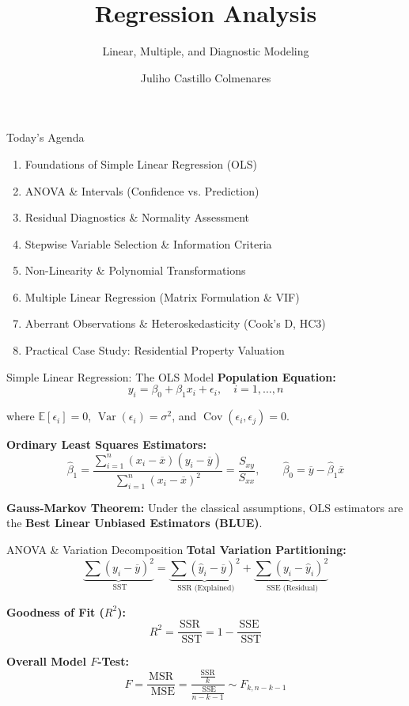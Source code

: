 \documentclass[aspectratio=169,ignorenonframetext]{beamer}
\title{\texorpdfstring{Regression Analysis}{Regression Analysis}}
\author{\texorpdfstring{Juliho Castillo
Colmenares}{Juliho Castillo Colmenares}}
\subtitle{Linear, Multiple, and Diagnostic Modeling}
\institute{Tec de Monterrey}
\date{}
\begin{document}
\frame{\titlepage}

\begin{frame}{Today's Agenda}
\begin{enumerate}
\item
  Foundations of Simple Linear Regression (OLS)
\item
  ANOVA \& Intervals (Confidence vs. Prediction)
\item
  Residual Diagnostics \& Normality Assessment
\item
  Stepwise Variable Selection \& Information Criteria
\item
  Non-Linearity \& Polynomial Transformations
\item
  Multiple Linear Regression (Matrix Formulation \& VIF)
\item
  Aberrant Observations \& Heteroskedasticity (Cook's D, HC3)
\item
  Practical Case Study: Residential Property Valuation
\end{enumerate}
\end{frame}

\begin{frame}{Simple Linear Regression: The OLS Model}
\textbf{Population Equation:}
\[y_{i} = \beta_{0} + \beta_{1}x_{i} + \epsilon_{i},\quad i = 1,\ldots,n\]

where \(\mathbb{E}\left\lbrack \epsilon_{i} \right\rbrack = 0\),
\(\operatorname{Var}(\epsilon_{i}) = \sigma^{2}\), and
\(\operatorname{Cov}(\epsilon_{i},\epsilon_{j}) = 0\).

\textbf{Ordinary Least Squares Estimators:}
\[{\hat{\beta}}_{1} = \frac{\sum_{i = 1}^{n}\left( x_{i} - \overline{x} \right)\left( y_{i} - \overline{y} \right)}{\sum_{i = 1}^{n}\left( x_{i} - \overline{x} \right)^{2}} = \frac{S_{xy}}{S_{xx}},\quad\quad{\hat{\beta}}_{0} = \overline{y} - {\hat{\beta}}_{1}\overline{x}\]

\textbf{Gauss-Markov Theorem:} Under the classical assumptions, OLS
estimators are the \textbf{Best Linear Unbiased Estimators (BLUE)}.
\end{frame}

\begin{frame}{ANOVA \& Variation Decomposition}
\textbf{Total Variation Partitioning:}
\[\underset{\text{ SST}}{\underbrace{\sum\left( y_{i} - \overline{y} \right)^{2}}} = \underset{\text{ SSR (Explained)}}{\underbrace{\sum\left( {\hat{y}}_{i} - \overline{y} \right)^{2}}} + \underset{\text{ SSE (Residual)}}{\underbrace{\sum\left( y_{i} - {\hat{y}}_{i} \right)^{2}}}\]

\textbf{Goodness of Fit (\(R^{2}\)):}
\[R^{2} = \frac{\text{SSR}}{\text{ SST}} = 1 - \frac{\text{SSE}}{\text{ SST}}\]

\textbf{Overall Model \(F\)-Test:}
\[F = \frac{\text{MSR}}{\text{ MSE}} = \frac{\frac{\text{SSR}}{k}}{\frac{\text{ SSE}}{n - k - 1}} \sim F_{k,n - k - 1}\]
\end{frame}
\end{document}
